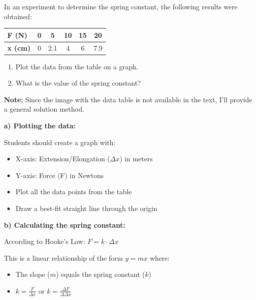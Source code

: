 \begin{exercise}
    In an experiment to determine the spring constant, the following results were obtained:
    \begin{table}[H]
        \centering
        \renewcommand{\arraystretch}{1.5}
        \begin{tabular}{Occccc}
            \bottomrule
            \textcolor{ocre}{\textbf{F (\unit{\newton})}}      & 0 & 5   & 10 & 15 & 20  \\
            \hline
            \textcolor{ocre}{\textbf{x (\unit{\centi\metre})}} & 0 & 2.1 & 4  & 6  & 7.9 \\
            \toprule
        \end{tabular}
        \label{tab:ejercicio1}
    \end{table}
    \begin{enumerate}[label=\alph*)]
        \item Plot the data from the table on a graph.
        \item What is the value of the spring constant?
    \end{enumerate}

    \begin{solu}
        \textbf{Note:} Since the image with the data table is not available in the text, I'll provide a general solution method.

        \textbf{a) Plotting the data:}

        Students should create a graph with:
        \begin{itemize}
            \item X-axis: Extension/Elongation ($\Delta x$) in meters
            \item Y-axis: Force (F) in Newtons
            \item Plot all the data points from the table
            \item Draw a best-fit straight line through the origin
        \end{itemize}

        \textbf{b) Calculating the spring constant:}

        According to Hooke's Law: $F = k \cdot \Delta x$

        This is a linear relationship of the form $y = mx$ where:
        \begin{itemize}
            \item The slope ($m$) equals the spring constant ($k$)
            \item $k = \frac{F}{\Delta x}$ or $k = \frac{\Delta F}{\Delta \Delta x}$
        \end{itemize}


\end{solu}
\end{exercise}

